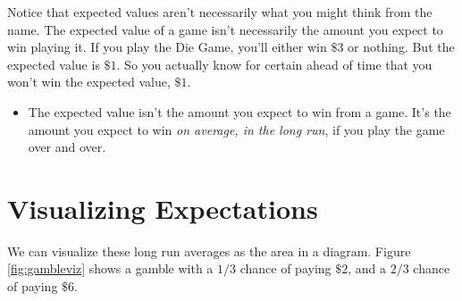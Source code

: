 \documentclass[justified]{tufte-book}
\newenvironment{warning}{\begin{itemize}\item[\faBan]}{\end{itemize}}
\theoremstyle{definition}
\theoremstyle{definition}
\theoremstyle{definition}
\theoremstyle{definition}
\theoremstyle{remark}
\begin{document}
Notice that expected values aren't necessarily what you might think from the name. The expected value of a game isn't necessarily the amount you expect to win playing it. If you play the Die Game, you'll either win \(\$3\) or nothing. But the expected value is \(\$1\). So you actually know for certain ahead of time that you won't win the expected value, \(\$1\).

\begin{warning}
The expected value isn't the amount you expect to win from a game. It's
the amount you expect to win \emph{on average, in the long run}, if you
play the game over and over.
\end{warning}

\hypertarget{visualizing-expectations}{%
\section{Visualizing Expectations}\label{visualizing-expectations}}

We can visualize these long run averages as the area in a diagram. Figure \ref{fig:gambleviz} shows a gamble with a \(1/3\) chance of paying \(\$2\), and a \(2/3\) chance of paying \(\$6\).
\end{document}
